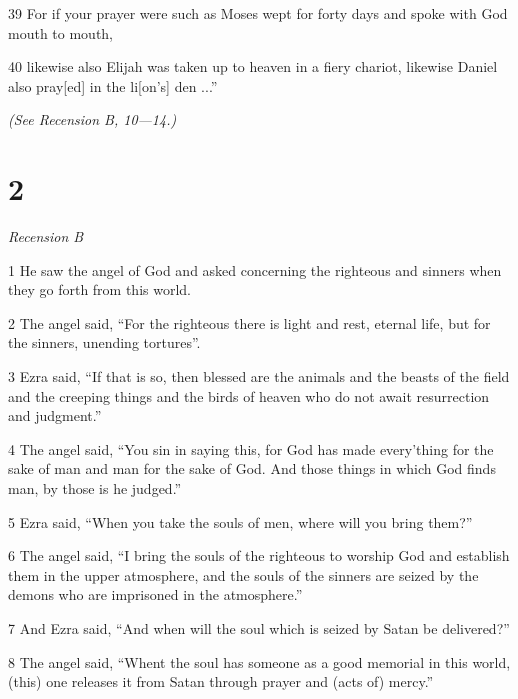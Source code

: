 \par 39 For if your prayer were such as Moses wept for forty days and spoke with God mouth to mouth,


\par 40 likewise also Elijah was taken up to heaven in a fiery chariot, likewise Daniel also pray[ed] in the li[on's] den ...”

\par \textit{(See Recension B, 10—14.)}

\chapter{2}

\par \textit{Recension B}

\par 1 He saw the angel of God and asked concerning the righteous and sinners when they go forth from this world.

\par 2 The angel said, “For the righteous there is light and rest, eternal life, but for the sinners, unending tortures”.

\par 3 Ezra said, “If that is so, then blessed are the animals and the beasts of the field and the creeping things and the birds of heaven who do not await resurrection and judgment.”

\par 4 The angel said, “You sin in saying this, for God has made every'thing for the sake of man and man for the sake of God. And those things in which God finds man, by those is he judged.”

\par 5 Ezra said, “When you take the souls of men, where will you bring them?”

\par 6 The angel said, “I bring the souls of the righteous to worship God and establish them in the upper atmosphere, and the souls of the sinners are seized by the demons who are imprisoned in the atmosphere.”

\par 7 And Ezra said, “And when will the soul which is seized by Satan be delivered?”

\par 8 The angel said, “Whent the soul has someone as a good memorial in this world, (this) one releases it from Satan through prayer and (acts of) mercy.”

